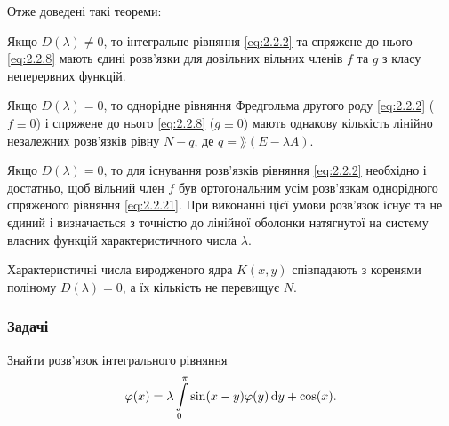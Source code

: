 Отже доведені такі теореми:

\begin{theorem}
	Якщо $D(\lambda) \ne 0$, то інтегральне рівняння \eqref{eq:2.2.2} та спряжене до нього \eqref{eq:2.2.8} мають єдині розв'язки для довільних вільних членів $f$ та $g$ з класу неперервних функцій.
\end{theorem}

\begin{theorem}
	Якщо $D(\lambda) = 0$, то однорідне рівняння Фредгольма другого роду \eqref{eq:2.2.2} ($f \equiv 0$) і спряжене до нього \eqref{eq:2.2.8} ($g \equiv 0$) мають однакову кількість лінійно незалежних розв'язків рівну $N - q$, де $q = \rang(E - \lambda A)$.
\end{theorem}

\begin{theorem}
	Якщо $D(\lambda) = 0$, то для існування розв'язків рівняння \eqref{eq:2.2.2} необхідно і достатньо, щоб вільний член $f$ був ортогональним усім розв'язкам однорідного спряженого рівняння \eqref{eq:2.2.21}. При виконанні цієї умови розв'язок існує та не єдиний і визначається з точністю до лінійної оболонки натягнутої на систему власних функцій характеристичного числа $\lambda$.
\end{theorem}

\begin{corollary}
	Характеристичні числа виродженого ядра $K(x, y)$ співпадають з коренями поліному $D(\lambda) = 0$, а їх кількість не перевищує $N$.
\end{corollary}

\subsubsection{Задачі}

\begin{example}
	Знайти розв'язок інтегрального рівняння \[ \varphi(x) = \lambda \displaystyle\int\limits_0^\pi \sin(x - y) \varphi(y) \mathop{}\!\mathrm{d} y + \cos(x). \]
\end{example}

